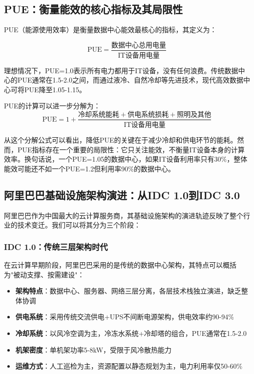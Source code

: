 \subsection{PUE：衡量能效的核心指标及其局限性}

\begin{definition}
PUE（能源使用效率）是衡量数据中心能效最核心的指标，其定义为：

\begin{equation}
    \text{PUE} = \frac{\text{数据中心总用电量}}{\text{IT设备用电量}}
\end{equation}

理想情况下，PUE=1.0表示所有电力都用于IT设备，没有任何浪费。传统数据中心的PUE通常在1.5-2.0之间，而通过液冷、自然冷却等先进技术，现代高效数据中心可将PUE降至1.05-1.15。
\end{definition}

PUE的计算可以进一步分解为：
\begin{equation}
    \text{PUE} = 1 + \frac{\text{冷却系统能耗} + \text{供电系统损耗} + \text{照明及其他}}{\text{IT设备用电量}}
\end{equation}

从这个分解公式可以看出，降低PUE的关键在于减少冷却和供电环节的能耗。然而，PUE指标存在一个重要的局限性：它只关注能效，不衡量IT设备本身的计算效率。换句话说，一个PUE=1.05的数据中心，如果IT设备利用率只有30\%，整体能效可能还不如一个PUE=1.2但利用率90\%的数据中心。

\subsection{阿里巴巴基础设施架构演进：从IDC 1.0到IDC 3.0}

阿里巴巴作为中国最大的云计算服务商，其基础设施架构的演进轨迹反映了整个行业的技术变迁。我们可以将其分为三个阶段：

\subsubsection{IDC 1.0：传统三层架构时代}

在云计算早期阶段，阿里巴巴采用的是传统的数据中心架构，其特点可以概括为"被动支撑、按需建设"：

\begin{itemize}
    \item \textbf{架构特点}：数据中心、服务器、网络三层分离，各层技术栈独立演进，缺乏整体协调
    \item \textbf{供电系统}：采用传统交流供电+UPS不间断电源架构，供电效率约90-94\%
    \item \textbf{冷却系统}：以风冷空调为主，冷冻水系统+冷却塔的组合，PUE通常在1.5-2.0
    \item \textbf{机架密度}：单机架功率5-8kW，受限于风冷散热能力
    \item \textbf{运维方式}：人工巡检为主，资源配置以静态规划为主，电力利用率仅50-60\%
\end{itemize}


